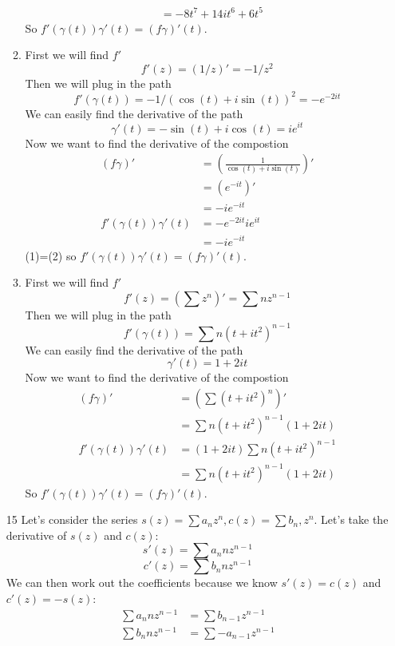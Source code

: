 \documentclass{article}
\begin{document}
\begin{enumerate}
\begin{enumerate}[label=(\roman*)]
\begin{align*}
            &=-8t^7+14it^6+6t^5
          \end{align*}
          So $f'(\gamma(t))\gamma'(t)=(f\gamma)'(t)$.
        \item
          First we will find $f'$
          \[f'(z)=(1/z)'=-1/z^2\]
          Then we will plug in the path
          \[f'(\gamma(t))=-1/(\cos(t)+i\sin(t))^2=-e^{-2it}\]
          We can easily find the derivative of the path
          \[\gamma'(t)=-\sin(t)+i\cos(t)=ie^{it}\]
          Now we want to find the derivative of the compostion
          \begin{align*}
            (f\gamma)'&=\left(\frac{1}{\cos(t)+i\sin(t)}\right)'\\
            &=\left(e^{-it}\right)'\\
            &=-ie^{-it}\tag{1}\\
            f'(\gamma(t))\gamma'(t)&=-e^{-2it}ie^{it}\\
            &=-ie^{-it}\tag{2}
          \end{align*}
          (1)=(2) so $f'(\gamma(t))\gamma'(t)=(f\gamma)'(t)$.
        \item
          First we will find $f'$
          \[f'(z)=\left(\sum z^n\right)'=\sum nz^{n-1}\]
          Then we will plug in the path
          \[f'(\gamma(t))=\sum n(t+it^2)^{n-1}\]
          We can easily find the derivative of the path
          \[\gamma'(t)=1+2it\]
          Now we want to find the derivative of the compostion
          \begin{align*}
            (f\gamma)'&=\left(\sum (t+it^2)^n\right)'\\
            &=\sum n(t+it^2)^{n-1}(1+2it)\\
            f'(\gamma(t))\gamma'(t)&=(1+2it)\sum n(t+it^2)^{n-1}\\
            &=\sum n(t+it^2)^{n-1}(1+2it)
          \end{align*}
          So $f'(\gamma(t))\gamma'(t)=(f\gamma)'(t)$.
      \end{enumerate}
    \item[15]
      Let's consider the series $s(z)=\sum a_nz^n, c(z)=\sum b_n,z^n$. Let's take the derivative of $s(z)$ and $c(z)$:
      \[s'(z)=\sum a_nnz^{n-1}\]
      \[c'(z)=\sum b_nnz^{n-1}\]
      We can then work out the coefficients because we know $s'(z)=c(z)$ and $c'(z)=-s(z)$:
      \begin{align*}
        \sum a_nnz^{n-1}&=\sum b_{n-1}z^{n-1}\tag{1}\\
        \sum b_nnz^{n-1}&=\sum -a_{n-1}z^{n-1}\tag{2}\\

\end{align*}
\end{enumerate}
\end{document}

